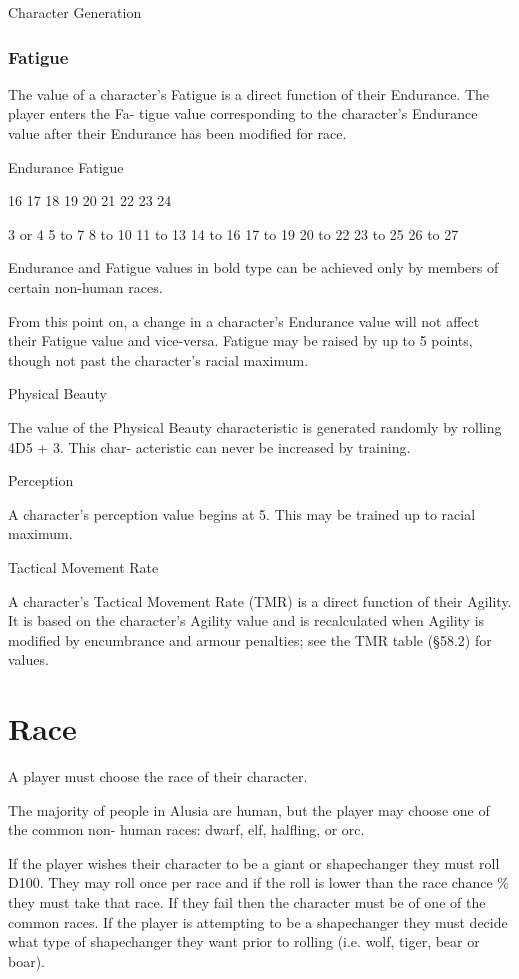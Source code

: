 \begin{Chapter}{Character Generation}
\subsubsection{Fatigue}

The value of a character’s Fatigue is a direct function of their
Endurance.  The player enters the Fa- tigue value corresponding to the
character’s Endurance value after their Endurance has been modified
for race.

Endurance  Fatigue 

16 
17 
18 
19 
20 
21 
22 
23 
24 

3 or 4 
5 to 7 
8 to 10 
11 to 13 
14 to 16 
17 to 19 
20 to 22 
23 to 25 
26 to 27

Endurance and Fatigue values in bold type can be achieved only by
members of certain non-human races.

From this point on, a change in a character’s Endurance value will not
affect their Fatigue value and vice-versa.  Fatigue may be raised by
up to 5 points, though not past the character’s racial maximum.

Physical Beauty 

The  value  of  the  Physical  Beauty  characteristic  is 
generated randomly by rolling 4D5 + 3. This char-
acteristic can never be increased by training. 

Perception 

A  character’s  perception  value  begins  at  5.  This 
may be trained up to racial maximum. 

Tactical Movement Rate 

A character’s Tactical Movement Rate (TMR) is a 
direct  function  of  their  Agility.  It  is  based  on  the 
character’s  Agility  value  and  is  recalculated  when 
Agility  is  modified  by  encumbrance  and  armour 
penalties; see the TMR table (§58.2) for values. 

\section{Race}

A player must choose the race of their character.

The majority of people in Alusia are human, but the player may choose
one of the common non- human races: dwarf, elf, halfling, or orc.

If the player wishes their character to be a giant or shapechanger
they must roll D100.  They may roll once per race and if the roll is
lower than the race chance \% they must take that race. If they fail
then the character must be of one of the common races.  If the player
is attempting to be a shapechanger they must decide what type of
shapechanger they want prior to rolling (i.e. wolf, tiger, bear or
boar).


\end{Chapter}
